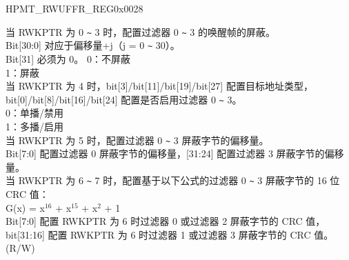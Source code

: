 \begin{register}{H}{PMT\_RWUFFR\_REG}{0x0028}\label{regdesc:PMTRWUFFRREG}
%
\regnewline%
\begin{regdesc}\begin{reglist}
\item [WKUPPKTFILTER] 当 RWKPTR 为 0 \verb+~+ 3 时，配置过滤器 0 \verb+~+ 3 的唤醒帧的屏蔽。\\
Bit[30:0] 对应于偏移量+j（j = 0 \verb+~+ 30）。\\ Bit[31] 必须为 0。
0：不屏蔽\\
1：屏蔽\\
当 RWKPTR 为 4 时，bit[3]/bit[11]/bit[19]/bit[27] 配置目标地址类型，bit[0]/bit[8]/bit[16]/bit[24] 配置是否启用过滤器 0 \verb+~+ 3。\\
0：单播/禁用\\
1：多播/启用\\
当 RWKPTR 为 5 时，配置过滤器 0 \verb+~+ 3 屏蔽字节的偏移量。\\
Bit[7:0] 配置过滤器 0 屏蔽字节的偏移量，[31:24] 配置过滤器 3 屏蔽字节的偏移量。\\
当 RWKPTR 为 6 \verb+~+ 7 时，配置基于以下公式的过滤器 0 \verb+~+ 3 屏蔽字节的 16 位 CRC 值：\\
G(x) = x$^\text{16}$ + x$^\text{15}$ + x$^\text{2}$ + 1\\
Bit[7:0] 配置 RWKPTR 为 6 时过滤器 0 或过滤器 2 屏蔽字节的 CRC 值，bit[31:16] 配置 RWKPTR 为 6 时过滤器 1 或过滤器 3 屏蔽字节的 CRC 值。\\
(R/W)
\end{reglist}\end{regdesc}
\end{register}


